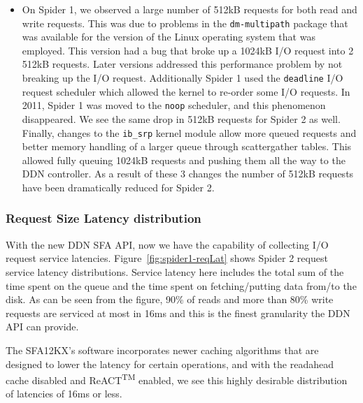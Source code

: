 \begin{itemize}
\item   On Spider 1, we observed a large number of 512kB requests for both read
and write requests. This was due to problems in the {\tt dm-multipath} \cite
{mpath}
package that was available for the version of the Linux operating system that
was employed. This version had a bug that broke up a 1024kB I/O request into 2
512kB requests. Later versions addressed this performance problem by not
breaking up the I/O request. Additionally Spider 1 used the {\tt deadline} I/O
request scheduler which allowed the kernel to re-order some I/O
requests.  In 2011, Spider 1 was moved to the  {\tt noop} scheduler, and this
phenomenon disappeared. We see the same drop in 512kB requests for Spider 2 as
well. Finally, changes to the {\tt ib\_srp} kernel module allow more queued
requests
and better memory handling of a larger queue through scatter\/gather tables.
This allowed fully queuing 1024kB requests and pushing them all the way to the
DDN controller. As a result of these 3 changes the number of 512kB requests
have been dramatically reduced for Spider 2.  \end{itemize}

\subsubsection{Request Size Latency distribution}

With the new DDN SFA API, now we have the capability of collecting I/O request
service latencies. Figure~\ref{fig:spider1-reqLat} shows Spider 2 request
service latency distributions. Service latency here includes the total sum of
the time spent on the queue and the time spent on fetching/putting data from/to
the disk. As can be seen from the figure, 90\% of reads and more than 80\%
write requests are serviced at most in 16ms and this is the finest granularity
the DDN API can provide. 

The SFA12KX's software incorporates newer caching algorithms that are designed
to lower the latency for certain operations, and with the readahead cache
disabled and ReACT\textsuperscript{TM} enabled, we see this highly desirable
distribution of latencies of 16ms or less.

